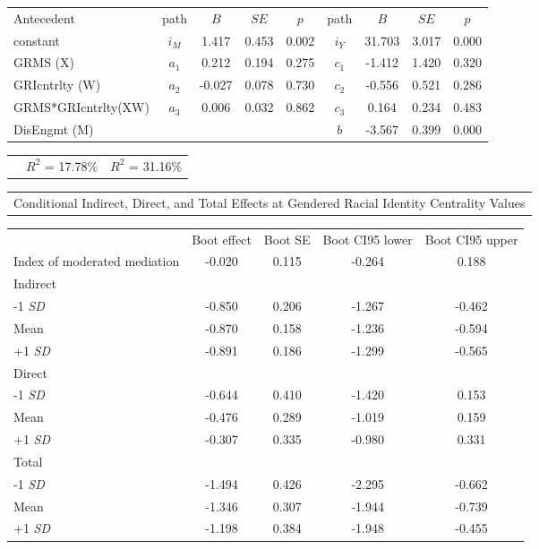 \documentclass[
  english,
]{book}
\begin{document}
\begin{longtable}[]{@{}lcccccccc@{}}
\toprule
& & & & & & & & \\
\midrule
\endhead
Antecedent & path & \(B\) & \(SE\) & \(p\) & path & \(B\) & \(SE\) & \(p\) \\
constant & \(i_{M}\) & 1.417 & 0.453 & 0.002 & \(i_{Y}\) & 31.703 & 3.017 & 0.000 \\
GRMS (X) & \(a_{1}\) & 0.212 & 0.194 & 0.275 & \(c_{1}\) & -1.412 & 1.420 & 0.320 \\
GRIcntrlty (W) & \(a_{2}\) & -0.027 & 0.078 & 0.730 & \(c_{2}\) & -0.556 & 0.521 & 0.286 \\
GRMS*GRIcntrlty(XW) & \(a_{3}\) & 0.006 & 0.032 & 0.862 & \(c_{3}\) & 0.164 & 0.234 & 0.483 \\
DisEngmt (M) & & & & & \(b\) & -3.567 & 0.399 & 0.000 \\
\bottomrule
\end{longtable}

\begin{longtable}[]{@{}lcc@{}}
\toprule
& & \\
\midrule
\endhead
& \(R^2\) = 17.78\% & \(R^2\) = 31.16\% \\
\bottomrule
\end{longtable}

\begin{longtable}[]{@{}
  >{\centering\arraybackslash}p{}@{}}
\toprule
 \\
\midrule
\endhead
Conditional Indirect, Direct, and Total Effects at Gendered Racial Identity Centrality Values \\
\bottomrule
\end{longtable}

\begin{longtable}[]{@{}lcccc@{}}
\toprule
& & & & \\
\midrule
\endhead
& Boot effect & Boot SE & Boot CI95 lower & Boot CI95 upper \\
Index of moderated mediation & -0.020 & 0.115 & -0.264 & 0.188 \\
Indirect & & & & \\
-1 \emph{SD} & -0.850 & 0.206 & -1.267 & -0.462 \\
Mean & -0.870 & 0.158 & -1.236 & -0.594 \\
+1 \emph{SD} & -0.891 & 0.186 & -1.299 & -0.565 \\
Direct & & & & \\
-1 \emph{SD} & -0.644 & 0.410 & -1.420 & 0.153 \\
Mean & -0.476 & 0.289 & -1.019 & 0.159 \\
+1 \emph{SD} & -0.307 & 0.335 & -0.980 & 0.331 \\
Total & & & & \\
-1 \emph{SD} & -1.494 & 0.426 & -2.295 & -0.662 \\
Mean & -1.346 & 0.307 & -1.944 & -0.739 \\
+1 \emph{SD} & -1.198 & 0.384 & -1.948 & -0.455 \\
\bottomrule
\end{longtable}
\end{document}
